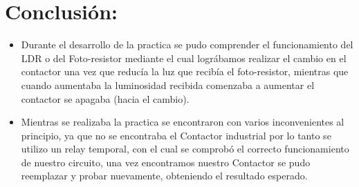 \documentclass[14pt,letterpaper]{article}
\begin{document}
\section{Conclusión:}
\begin{itemize}
\item Durante el desarrollo de la practica se pudo comprender el funcionamiento del LDR o del Foto-resistor mediante el cual lográbamos realizar el cambio en el contactor una vez que reducía la luz que recibía el foto-resistor, mientras que cuando aumentaba la luminosidad recibida comenzaba a aumentar el contactor se apagaba (hacia el cambio).
\item Mientras se realizaba la practica se encontraron con varios inconvenientes al principio, ya que no se encontraba el Contactor industrial por lo tanto se utilizo un relay temporal, con el cual se comprobó el correcto funcionamiento de nuestro circuito, una vez encontramos nuestro Contactor se pudo reemplazar y probar nuevamente, obteniendo el resultado esperado.
\end{itemize}
\end{document}
